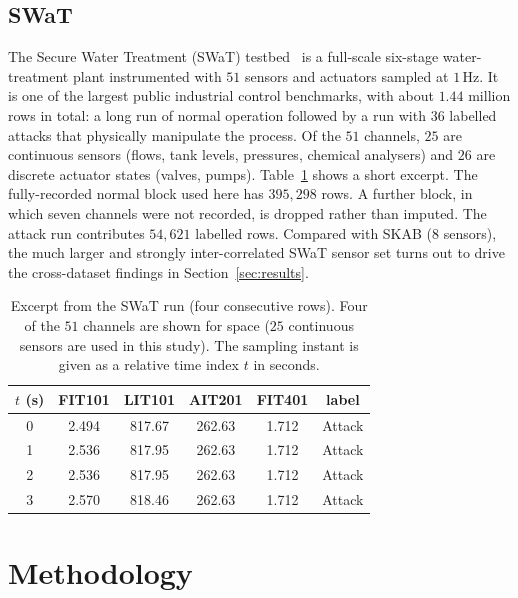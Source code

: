 \documentclass[runningheads]{llncs}
\begin{document}
\subsection{SWaT}
The Secure Water Treatment (SWaT) testbed~\cite{goh2016,mathur2016} is a
full-scale six-stage water-treatment plant instrumented with $51$ sensors and
actuators sampled at $1$\,Hz. It is one of the largest public industrial control
benchmarks, with about $1.44$ million rows in total: a long run of normal
operation followed by a run with $36$ labelled attacks that physically manipulate
the process. Of the $51$ channels, $25$ are continuous sensors (flows, tank
levels, pressures, chemical analysers) and $26$ are discrete actuator states
(valves, pumps). Table~\ref{tab:swathead} shows a short excerpt. The
fully-recorded normal block used here has $395{,}298$ rows. A further block, in
which seven channels were not recorded, is dropped rather than imputed. The
attack run contributes $54{,}621$ labelled rows. Compared with SKAB ($8$
sensors), the much larger and strongly inter-correlated SWaT sensor set turns out
to drive the cross-dataset findings in Section~\ref{sec:results}.

\begin{table}[htbp]
\centering
\caption{Excerpt from the SWaT run (four consecutive rows). Four of the $51$
channels are shown for space ($25$ continuous sensors are used in this study).
The sampling instant is given as a relative time index $t$ in seconds.}
\label{tab:swathead}
\setlength{\tabcolsep}{5pt}
\footnotesize
\begin{tabular}{cccccc}
\toprule
$t$ (s) & FIT101 & LIT101 & AIT201 & FIT401 & label \\
\midrule
0 & 2.494 & 817.67 & 262.63 & 1.712 & Attack \\
1 & 2.536 & 817.95 & 262.63 & 1.712 & Attack \\
2 & 2.536 & 817.95 & 262.63 & 1.712 & Attack \\
3 & 2.570 & 818.46 & 262.63 & 1.712 & Attack \\
\bottomrule
\end{tabular}
\end{table}

\section{Methodology}
\label{sec:method}
\end{document}
